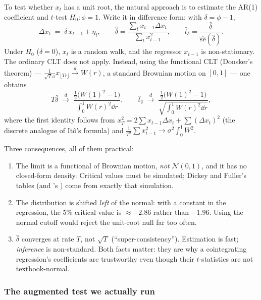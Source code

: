 To test whether $x_t$ has a unit root, the natural approach is to estimate the AR(1)
coefficient and $t$-test $H_0:\phi=1$. Write it in difference form: with
$\delta=\phi-1$,
\begin{equation}
  \Delta x_t \;=\; \delta\, x_{t-1} + \eta_t ,
  \qquad
  \hat\delta = \frac{\sum_t x_{t-1}\Delta x_t}{\sum_t x_{t-1}^2},
  \qquad
  \hat t_\delta = \frac{\hat\delta}{\hat{\mathrm{se}}(\hat\delta)} .
  \label{eq:df}
\end{equation}
Under $H_0$ ($\delta=0$), $x_t$ is a random walk, and the regressor $x_{t-1}$ is
non-stationary. The ordinary CLT does not apply. Instead, using the functional CLT
(Donsker's theorem) --- $\frac{1}{\sqrt T\sigma}x_{\lfloor Tr\rfloor}
\xrightarrow{d} W(r)$, a standard Brownian motion on $[0,1]$ --- one obtains
\begin{equation}
  T\hat\delta \;\xrightarrow{\ d\ }\;
  \frac{\tfrac12\bigl(W(1)^2-1\bigr)}{\int_0^1 W(r)^2\dd r},
  \qquad
  \hat t_\delta \;\xrightarrow{\ d\ }\;
  \frac{\tfrac12\bigl(W(1)^2-1\bigr)}{\sqrt{\int_0^1 W(r)^2\dd r}} ,
  \label{eq:dfdistribution}
\end{equation}
where the first identity follows from $x_T^2 = 2\sum x_{t-1}\Delta x_t + \sum(\Delta x_t)^2$
(the discrete analogue of Itô's formula) and $\frac{1}{T^2}\sum x_{t-1}^2\to
\sigma^2\int_0^1W^2$.

Three consequences, all of them practical:
\begin{enumerate}
  \item The limit is a functional of Brownian motion, \emph{not} $\mathcal N(0,1)$, and it
    has no closed-form density. Critical values must be simulated; Dickey and Fuller's
    tables (and 's ) come from exactly that simulation.
  \item The distribution is shifted \emph{left} of the normal: with a constant in the
    regression, the 5\% critical value is $\approx-2.86$ rather than $-1.96$. Using the
    normal cutoff would reject the unit-root null far too often.
  \item $\hat\delta$ converges at rate $T$, not $\sqrt T$ (``super-consistency'').
    Estimation is fast; \emph{inference} is non-standard. Both facts matter: they are why
    a cointegrating regression's coefficients are trustworthy even though their
    $t$-statistics are not textbook-normal.
\end{enumerate}

\subsubsection{The augmented test we actually run}

